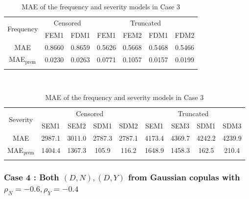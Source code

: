 \documentclass[11pt]{article}
\begin{document}
\begin{table}[!h]
\renewcommand{\tabcolsep}{0.8mm}
\renewcommand{\arraystretch}{1}
\footnotesize
\centering
{\color{blue}
\begin{tabular}[h]{ccccccc}
\toprule
\multirow{2}{*}{Frequency} & \multicolumn{2}{c}{Censored} & \multicolumn{4}{c}{Truncated}\\
\cmidrule(l{3pt}r{3pt}){2-3} \cmidrule(l{3pt}r{3pt}){4-7}
 & FEM1 & FDM1 & FEM1 & FEM2 & FDM1 & FDM2\\
\midrule
MAE & 0.8660 & 0.8659 & 0.5626 & 0.5668 & 0.5468 & 0.5466 \\
MAE$_{\text{prem}}$ & 0.0230 & 0.0263 & 0.0771 & 0.1057 & 0.0157 & 0.0199 \\
\hhline{=======}
\end{tabular}
\\
\vspace{0.3cm}
\begin{tabular}[h]{ccccccccc}
\toprule
\multirow{2}{*}{Severity} & \multicolumn{4}{c}{Censored} & \multicolumn{4}{c}{Truncated}\\
\cmidrule(l{3pt}r{3pt}){2-5} \cmidrule(l{3pt}r{3pt}){6-9}
 & SEM1 & SEM2 & SDM1 & SDM2 & SEM1 & SEM3 & SDM1 & SDM3\\
\midrule
MAE & 2987.1 & 3011.0 & 2787.3 & 2787.1 & 4173.4 & 4369.7 & 4242.2 & 4239.9 \\
MAE$_{\text{prem}}$ & 1404.4 & 1367.3 & 105.9 & 116.2 & 1648.9 & 1458.3 & 162.5 & 210.4 \\
\hhline{=========}
\end{tabular}
}
\caption{MAE of the frequency and severity models in Case 3}\label{tab:maecase3}
\end{table}


\FloatBarrier

\subsubsection*{Case 4 : Both $(D,N),(D, Y)$ from Gaussian copulas with $\rho_N=-0.6,  \rho_Y=-0.4$}
\end{document}
